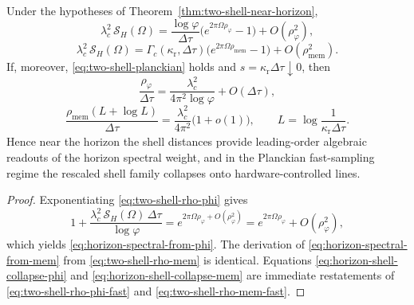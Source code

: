 \begin{corollary}\label{cor:horizon-spectral-tomography}
Under the hypotheses of Theorem~\ref{thm:two-shell-near-horizon},
\begin{equation}\label{eq:horizon-spectral-from-phi}
\lambda_c^2\,\mathcal S_H(\Omega)
=
\frac{\log\varphi}{\Delta\tau}
\bigl(e^{2\pi\Omega\rho_\varphi}-1\bigr)
+O(\rho_\varphi^2),
\end{equation}
\begin{equation}\label{eq:horizon-spectral-from-mem}
\lambda_c^2\,\mathcal S_H(\Omega)
=
\Gamma_c(\kappa_{\mathrm r},\Delta\tau)
\bigl(e^{2\pi\Omega\rho_{\mathrm{mem}}}-1\bigr)
+O(\rho_{\mathrm{mem}}^2).
\end{equation}
If, moreover, \eqref{eq:two-shell-planckian} holds and $s=\kappa_{\mathrm r}\Delta\tau\downarrow 0$, then
\begin{equation}\label{eq:horizon-shell-collapse-phi}
\frac{\rho_\varphi}{\Delta\tau}
=
\frac{\lambda_c^2}{4\pi^2\log\varphi}
+O(\Delta\tau),
\end{equation}
\begin{equation}\label{eq:horizon-shell-collapse-mem}
\frac{\rho_{\mathrm{mem}}(L+\log L)}{\Delta\tau}
=
\frac{\lambda_c^2}{4\pi^2}\bigl(1+o(1)\bigr),
\qquad
L=\log\frac{1}{\kappa_{\mathrm r}\Delta\tau}.
\end{equation}
Hence near the horizon the shell distances provide leading-order algebraic readouts of the horizon spectral weight, and in the Planckian fast-sampling regime the rescaled shell family collapses onto hardware-controlled lines.
\end{corollary}

\begin{proof}
Exponentiating \eqref{eq:two-shell-rho-phi} gives
\[
1+\frac{\lambda_c^2\,\mathcal S_H(\Omega)\,\Delta\tau}{\log\varphi}
=
e^{2\pi\Omega\rho_\varphi+O(\rho_\varphi^2)}
=
e^{2\pi\Omega\rho_\varphi}+O(\rho_\varphi^2),
\]
which yields \eqref{eq:horizon-spectral-from-phi}. The derivation of \eqref{eq:horizon-spectral-from-mem} from \eqref{eq:two-shell-rho-mem} is identical. Equations \eqref{eq:horizon-shell-collapse-phi} and \eqref{eq:horizon-shell-collapse-mem} are immediate restatements of \eqref{eq:two-shell-rho-phi-fast} and \eqref{eq:two-shell-rho-mem-fast}.
\end{proof}

